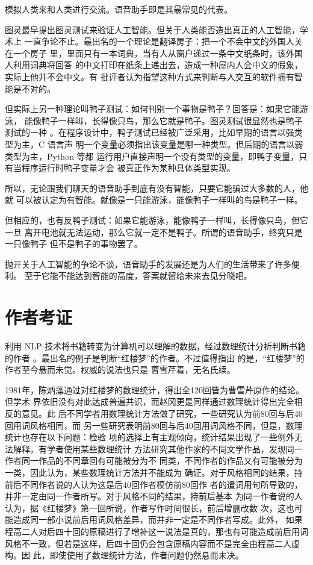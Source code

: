 \documentclass[../main]{subfiles}
\begin{document}
模拟人类来和人类进行交流。语音助手即是其最常见的代表。

图灵最早提出图灵测试来验证人工智能。但关于人类能否造出真正的人工智能，学术上
一直争论不止。最出名的一个理论是翻译房子：把一个不会中文的外国人关在一个房子
里，里面只有一本词典，当有人从窗户递过一条中文纸条时，该外国人利用词典将回答
的中文打印在纸条上递出去，造成一种屋内人会中文的假象，实际上他并不会中文。有
批评者认为指望这种方式来判断与人交互的软件拥有智能是不对的。

但实际上另一种理论叫鸭子测试：如何判别一个事物是鸭子？回答是：如果它能游泳，
能像鸭子一样叫，长得像只鸟，那么它就是鸭子。图灵测试很显然也是鸭子测试的一种
。在程序设计中，鸭子测试已经被广泛采用，比如早期的语言以强类型为主，C 语言声
明一个变量必须指出该变量是哪一种类型。但后期的语言以弱类型为主，Python 等都
运行用户直接声明一个没有类型的变量，即鸭子变量，只有当程序运行时鸭子变量才会
被真正作为某种具体类型实现。

所以，无论跟我们聊天的语音助手到底有没有智能，只要它能骗过大多数的人，他就
可以被认定为有智能。就像是一只能游泳，能像鸭子一样叫的鸟是鸭子一样。

但相应的，也有反鸭子测试：如果它能游泳，能像鸭子一样叫，长得像只鸟，但它一旦
离开电池就无法运动，那么它就一定不是鸭子。所谓的语音助手，终究只是一只像鸭子
但不是鸭子的事物罢了。

抛开关于人工智能的争论不谈，语音助手的发展还是为人们的生活带来了许多便利。
至于它能不能达到智能的高度，答案就留给未来去见分晓吧。

\section{作者考证}%
\label{sec:author}

利用 NLP 技术将书籍转变为计算机可以理解的数据，经过数理统计分析判断书籍的作者
。最出名的例子是判断\enquote{红楼梦}的作者。不过值得指出
的是，\enquote{红楼梦}的作者至今悬而未觉。权威的说法也只是
曹雪芹着，无名氏续。

1981年，陈炳藻通过对红楼梦的数理统计，得出全120回皆为曹雪芹原作的结论。但学术
界依旧没有对此达成普遍共识，而赵冈更是同样通过数理统计得出完全相反的意见。此
后不同学者用数理统计方法做了研究，一些研究认为前80回与后40回用词风格相同，而
另一些研究表明前80回与后40回用词风格不同，但是，数理统计也存在以下问题：检验
项的选择上有主观倾向，统计结果出现了一些例外无法解释。有学者使用某些数理统计
方法研究其他作家的不同文学作品，发现同一作者同一作品的不同章回有可能被分为不
同类，不同作者的作品又有可能被分为一类，因此认为，某些数理统计方法并不能成为
确证。对于风格相同的结果，持前后不同作者说的人认为这是后40回作者模仿前80回作
者的遣词用句所导致的，并非一定由同一作者所写。对于风格不同的结果，持前后基本
为同一作者说的人认为，据《红楼梦》第一回所说，作者写作时间很长，前后增删改数
次，这也可能造成同一部小说前后用词风格差异，而并非一定是不同作者写成。此外，
如果程高二人对后四十回的原稿进行了增补这一说法是真的，那也有可能造成前后用词
风格不一致，但若是这样，后四十回仍会包含原稿内容而不是完全由程高二人虚构。因
此，即使使用了数理统计方法，作者问题仍然悬而未决。
\end{document}
